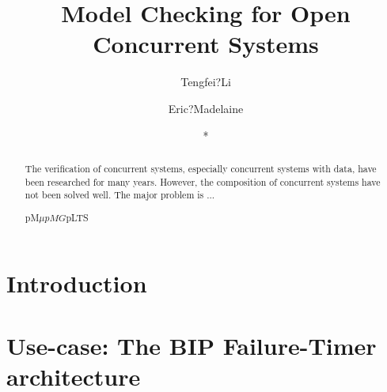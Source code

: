 \documentclass[runningheads,a4paper]{llncs}
\newcommand{\keywords}[1]{\par\addvspace\baselineskip
\noindent\keywordname\enspace\ignorespaces#1}
\begin{document}
\mainmatter  %

\title{Model Checking for Open Concurrent Systems}


%
%
\author{Tengfei?Li
\and Eric?Madelaine \and *
}
%



\institute{
}

%
%

\maketitle


\begin{abstract}

The verification of concurrent systems, especially concurrent systems with data, have been researched for many years. However, the composition of concurrent systems have not been solved well. The major problem is ...

\keywords{ pM$\mu$\quad $pMG $\quad pLTS }
\end{abstract}


\section{Introduction}

\section{Use-case: The BIP Failure-Timer architecture}\label{Sec2:usecase}
\end{document}
